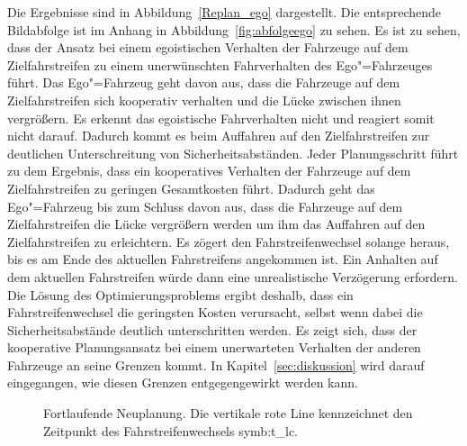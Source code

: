 Die Ergebnisse sind in Abbildung~\ref{Replan_ego} dargestellt.
Die entsprechende Bildabfolge ist im Anhang in Abbildung~\ref{fig:abfolgeego} zu sehen.
Es ist zu sehen, dass der Ansatz bei einem egoistischen Verhalten der Fahrzeuge auf dem Zielfahrstreifen zu einem unerw\"unschten Fahrverhalten des Ego"=Fahrzeuges f\"uhrt.
Das Ego"=Fahrzeug geht davon aus, dass die Fahrzeuge auf dem Zielfahrstreifen sich kooperativ verhalten und die L\"ucke zwischen ihnen vergr\"o{\ss}ern.
Es erkennt das egoistische Fahrverhalten nicht und reagiert somit nicht darauf.
Dadurch kommt es beim Auffahren auf den Zielfahrstreifen zur deutlichen Unterschreitung von Sicherheitsabst\"anden.
Jeder Planungsschritt f\"uhrt zu dem Ergebnis, dass ein kooperatives Verhalten der Fahrzeuge auf dem Zielfahrstreifen zu geringen Gesamtkosten f\"uhrt.
Dadurch geht das Ego"=Fahrzeug bis zum Schluss davon aus, dass die Fahrzeuge auf dem Zielfahrstreifen die L\"ucke vergr\"o{\ss}ern werden um ihm das Auffahren auf den Zielfahrstreifen zu erleichtern.
Es z\"ogert den Fahrstreifenwechsel solange heraus, bis es am Ende des aktuellen Fahrstreifens angekommen ist.
Ein Anhalten auf dem aktuellen Fahrstreifen w\"urde dann eine unrealistische Verz\"ogerung erfordern.
Die L\"osung des Optimierungsproblems ergibt deshalb, dass ein Fahrstreifenwechsel die geringsten Kosten verursacht, selbst wenn dabei die Sicherheitsabst\"ande deutlich unterschritten werden. 
Es zeigt sich, dass der kooperative Planungsansatz bei einem unerwarteten Verhalten der anderen Fahrzeuge an seine Grenzen kommt.
In Kapitel~\ref{sec:diskussion} wird darauf eingegangen, wie diesen Grenzen entgegengewirkt werden kann.

\begin{figure}[!htbp]
    \centering
    \caption[Fortlaufende Neuplanung]{Fortlaufende Neuplanung. Die vertikale rote Line kennzeichnet den Zeitpunkt des Fahrstreifenwechsels \gls{symb:t_lc}.}
    \label{fig:Fort_Neuplanung}
\end{figure}




